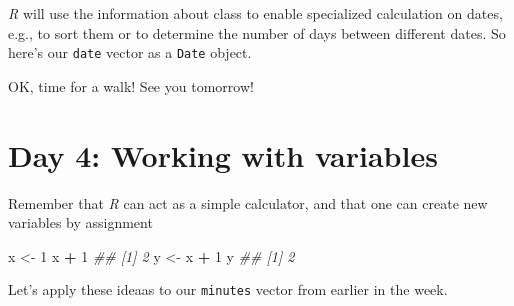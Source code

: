 \documentclass[
]{book}
\newenvironment{Shaded}{\begin{snugshade}}{\end{snugshade}}
\newcommand{\CommentTok}[1]{\textcolor[rgb]{0.56,0.35,0.01}{\textit{#1}}}
\newcommand{\DataTypeTok}[1]{\textcolor[rgb]{0.13,0.29,0.53}{#1}}
\newcommand{\DecValTok}[1]{\textcolor[rgb]{0.00,0.00,0.81}{#1}}
\newcommand{\KeywordTok}[1]{\textcolor[rgb]{0.13,0.29,0.53}{\textbf{#1}}}
\newcommand{\NormalTok}[1]{#1}
\newcommand{\OperatorTok}[1]{\textcolor[rgb]{0.81,0.36,0.00}{\textbf{#1}}}
\newcommand{\StringTok}[1]{\textcolor[rgb]{0.31,0.60,0.02}{#1}}
\begin{document}
\begin{Shaded}
\end{Shaded}

\emph{R} will use the information about class to enable specialized calculation on dates, e.g., to sort them or to determine the number of days between different dates. So here's our \texttt{date} vector as a \texttt{Date} object.

\begin{Shaded}
\end{Shaded}

OK, time for a walk! See you tomorrow!

\hypertarget{day-4-working-with-variables}{%
\section{Day 4: Working with variables}\label{day-4-working-with-variables}}

Remember that \emph{R} can act as a simple calculator, and that one can create new variables by assignment

\begin{Shaded}
\begin{Highlighting}[]
\NormalTok{x <-}\StringTok{ }\DecValTok{1}
\NormalTok{x }\OperatorTok{+}\StringTok{ }\DecValTok{1}
\CommentTok{## [1] 2}
\NormalTok{y <-}\StringTok{ }\NormalTok{x }\OperatorTok{+}\StringTok{ }\DecValTok{1}
\NormalTok{y}
\CommentTok{## [1] 2}
\end{Highlighting}
\end{Shaded}

Let's apply these ideaas to our \texttt{minutes} vector from earlier in the week.
\end{document}
